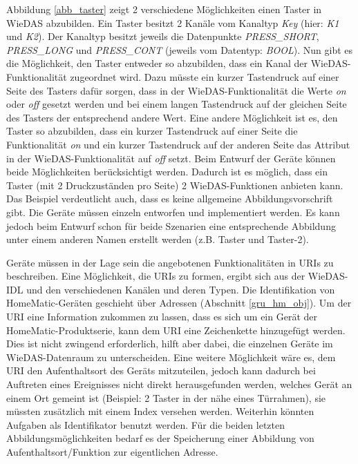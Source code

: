 
Abbildung \ref{abb_taster} zeigt 2 verschiedene Möglichkeiten einen Taster in WieDAS abzubilden.
Ein Taster besitzt 2 Kanäle vom Kanaltyp \emph{Key} (hier: \emph{K1} und \emph{K2}).
Der Kanaltyp besitzt jeweils die Datenpunkte \emph{PRESS\_SHORT}, \emph{PRESS\_LONG} und
\emph{PRESS\_CONT} \cite{hmscript4} (jeweils vom Datentyp: \emph{BOOL}).
Nun gibt es die Möglichkeit, den Taster entweder so abzubilden, dass ein Kanal der WieDAS-Funktionalität
zugeordnet wird.
Dazu müsste ein kurzer Tastendruck auf einer Seite des Tasters dafür sorgen, dass in der WieDAS-Funktionalität
die Werte \emph{on} oder \emph{off} gesetzt werden und bei einem langen Tastendruck auf der gleichen Seite
des Tasters der entsprechend andere Wert.
Eine andere Möglichkeit ist es, den Taster so abzubilden, dass ein kurzer Tastendruck auf einer Seite
die Funktionalität \emph{on} und ein kurzer Tastendruck auf der anderen Seite das Attribut in der
WieDAS-Funktionalität auf \emph{off} setzt.
Beim Entwurf der Geräte können beide Möglichkeiten berücksichtigt werden.
Dadurch ist es möglich, dass ein Taster (mit 2 Druckzuständen pro Seite) 2 WieDAS-Funktionen anbieten kann.
Das Beispiel verdeutlicht auch, dass es keine allgemeine Abbildungsvorschrift gibt.
Die Geräte müssen einzeln entworfen und implementiert werden.
Es kann jedoch beim Entwurf schon für beide Szenarien eine entsprechende Abbildung unter einem anderen
Namen erstellt werden (z.B. Taster und Taster-2).

Geräte müssen in der Lage sein die angebotenen Funktionalitäten in URIs zu beschreiben.
Eine Möglichkeit, die URIs zu formen, ergibt sich aus der WieDAS-IDL \cite{wiedas_idl}
und den verschiedenen Kanälen und deren Typen.
Die Identifikation von HomeMatic-Geräten geschieht über Adressen (Abschnitt \ref{gru_hm_obj}).
Um der URI eine Information zukommen zu lassen, dass es sich um ein Gerät der HomeMatic-Produktserie,
kann dem URI eine Zeichenkette hinzugefügt werden.
Dies ist nicht zwingend erforderlich, hilft aber dabei, die einzelnen Geräte im WieDAS-Datenraum
zu unterscheiden.
Eine weitere Möglichkeit wäre es, dem URI den Aufenthaltsort des Geräts mitzuteilen, jedoch kann
dadurch bei Auftreten eines Ereignisses nicht direkt herausgefunden werden, welches Gerät
an einem Ort gemeint ist (Beispiel: 2 Taster in der nähe eines Türrahmen), sie müssten zusätzlich
mit einem Index versehen werden.
Weiterhin könnten Aufgaben als Identifikator benutzt werden.
Für die beiden letzten Abbildungsmöglichkeiten bedarf es der Speicherung einer Abbildung
von Aufenthaltsort/Funktion zur eigentlichen Adresse.

